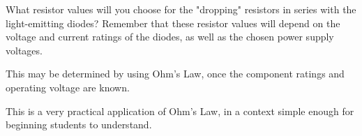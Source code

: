 

What resistor values will you choose for the "dropping" resistors in series with the light-emitting diodes?  Remember that these resistor values will depend on the voltage and current ratings of the diodes, as well as the chosen power supply voltages.







This may be determined by using Ohm's Law, once the component ratings and operating voltage are known.







This is a very practical application of Ohm's Law, in a context simple enough for beginning students to understand.



